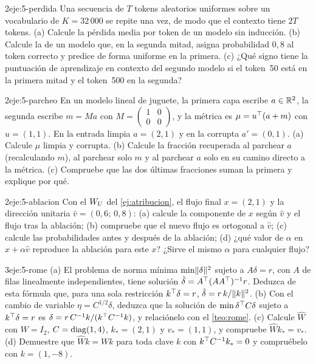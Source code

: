 \begin{ejercicio}{2}{eje:5-perdida}
Una secuencia de $T$ tokens aleatorios uniformes sobre un vocabulario de $K=32\,000$ se repite una vez, de modo que el contexto tiene $2T$ tokens. (a) Calcule la pérdida media por token de un modelo sin inducción. (b) Calcule la de un modelo que, en la segunda mitad, asigna probabilidad $0{,}8$ al token correcto y predice de forma uniforme en la primera. (c) ¿Qué signo tiene la puntuación de aprendizaje en contexto del segundo modelo si el token~50 está en la primera mitad y el token~500 en la segunda?
\end{ejercicio}

\begin{ejercicio}{2}{eje:5-parcheo}
En un modelo lineal de juguete, la primera capa escribe $a\in\mathbb{R}^{2}$, la segunda escribe $m=Ma$ con $M=\begin{pmatrix}1&0\\0&0\end{pmatrix}$, y la métrica es $\mu=u^{\top}(a+m)$ con $u=(1,1)$. En la entrada limpia $a=(2,1)$ y en la corrupta $a'=(0,1)$. (a) Calcule $\mu$ limpia y corrupta. (b) Calcule la fracción recuperada al parchear $a$ (recalculando $m$), al parchear solo $m$ y al parchear $a$ solo en su camino directo a la métrica. (c) Compruebe que las dos últimas fracciones suman la primera y explique por qué.
\end{ejercicio}

\begin{ejercicio}{2}{eje:5-ablacion}
Con el $W_{U}$ del \cref{ej:atribucion}, el flujo final $x=(2,1)$ y la dirección unitaria $\hat v=(0{,}6;\allowbreak\ 0{,}8)$: (a) calcule la componente de $x$ según $\hat v$ y el flujo tras la ablación; (b) compruebe que el nuevo flujo es ortogonal a $\hat v$; (c) calcule las probabilidades antes y después de la ablación; (d) ¿qué valor de $\alpha$ en $x+\alpha\hat v$ reproduce la ablación para este $x$? ¿Sirve el mismo $\alpha$ para cualquier flujo?
\end{ejercicio}

\begin{ejercicio}{3}{eje:5-rome}
(a) El problema de norma mínima $\min\lVert\delta\rVert^{2}$ sujeto a $A\delta=r$, con $A$ de filas linealmente independientes, tiene solución $\hat\delta=A^{\top}(AA^{\top})^{-1}r$. Deduzca de esta fórmula que, para una sola restricción $k^{\top}\delta=r$, $\hat\delta=r\,k/\lVert k\rVert^{2}$. (b) Con el cambio de variable $\eta=C^{1/2}\delta$, deduzca que la solución de $\min\delta^{\top} C\delta$ sujeto a $k^{\top}\delta=r$ es $\delta=r\,C^{-1}k/(k^{\top} C^{-1}k)$, y relaciónelo con el \cref{teo:rome}. (c) Calcule $\hat W$ con $W=I_2$, $C=\operatorname{diag}(1,4)$, $k_*=(2,1)$ y $v_*=(1,1)$, y compruebe $\hat Wk_*=v_*$. (d) Demuestre que $\hat Wk=Wk$ para toda clave $k$ con $k^{\top} C^{-1}k_*=0$ y compruébelo con $k=(1,-8)$.
\end{ejercicio}

